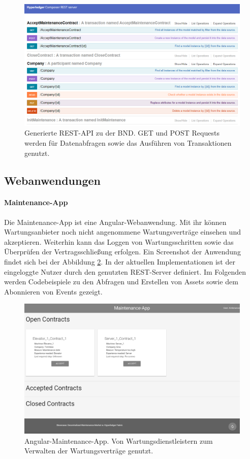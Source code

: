 \begin{figure}[!htbp]
    \centering
      \includegraphics[width=1.0\textwidth,angle=0]{images/rest-api}
       \caption{Generierte REST-API zu der \acs{BND}. GET und POST Requests werden für Datenabfragen sowie das Ausführen von Transaktionen genutzt.}
      \label{fig:rest-api}
\end{figure}

\subsection{Webanwendungen}

\paragraph{Maintenance-App}

Die Maintenance-App ist eine Angular-Webanwendung. Mit ihr können Wartungsanbieter noch nicht angenommene Wartungsverträge einsehen und akzeptieren. Weiterhin kann das Loggen von Wartungsschritten sowie das Überprüfen der Vertragsschließung erfolgen. Ein Screenshot der Anwendung findet sich bei der Abbildung \ref{fig:maintenance-app}. In der aktuellen Implementationen ist der eingeloggte Nutzer durch den genutzten REST-Server definiert. Im Folgenden werden Codebeispiele zu den Abfragen und Erstellen von Assets sowie dem Abonnieren von Events gezeigt.

\begin{figure}[!htbp]
    \centering
      \includegraphics[width=1.0\textwidth,angle=0]{images/maintenance-app}
       \caption{Angular-Maintenance-App. Von Wartungsdienstleistern zum Verwalten der Wartungsverträge genutzt.}
      \label{fig:maintenance-app}
\end{figure}

